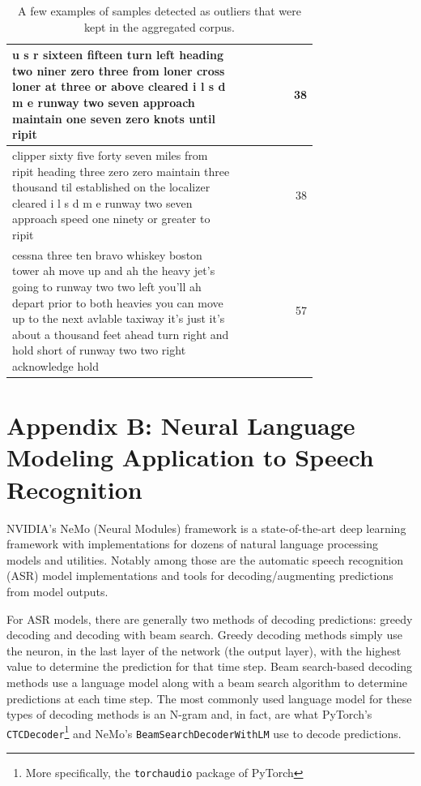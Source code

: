 \documentclass[12pt]{article}
\begin{document}
\begin{table}
\begin{tabular}{p{0.75\linewidth} r}
        \midrule
        u s r sixteen fifteen turn left heading two niner zero three from loner cross loner at three or above cleared i l s d m e runway two seven approach maintain one seven zero knots until ripit                                                                                                                               & 38              \\
        \midrule
        clipper sixty five forty seven miles from ripit heading three zero zero maintain three thousand til established on the localizer cleared i l s d m e runway two seven approach speed one ninety or greater to ripit                                                                                                         & 38              \\
        \midrule
        cessna three ten bravo whiskey boston tower ah move up and ah the heavy jet's going to runway two two left you'll ah depart prior to both heavies you can move up to the next avlable taxiway it's just it's about a thousand feet ahead turn right and hold short of runway two two right acknowledge hold                 & 57              \\
        \bottomrule
    \end{tabular}
    \caption{A few examples of samples detected as outliers that were kept in the aggregated corpus.}
    \label{tab:outlier_examples}
\end{table}

\newpage
\section{Appendix B: Neural Language Modeling Application to Speech Recognition}\label{sec:appendix_a}
NVIDIA's NeMo (Neural Modules) framework \cite{kuchaiev_nemo_2019} is a state-of-the-art deep learning framework with implementations for dozens of
natural language processing models and utilities. Notably among those are the automatic speech recognition (ASR) model implementations and tools for
decoding/augmenting predictions from model outputs.

For ASR models, there are generally two methods of decoding predictions: greedy decoding and decoding with beam search. Greedy decoding methods simply
use the neuron, in the last layer of the network (the output layer), with the highest value to determine the prediction for that time step. Beam
search-based decoding methods use a language model along with a beam search algorithm to determine predictions at each time step. The most commonly
used language model for these types of decoding methods is an N-gram and, in fact, are what PyTorch's \lstinline|CTCDecoder|\footnote{More
    specifically, the \lstinline|torchaudio| package of PyTorch} \cite{paszke_pytorch_2019} and NeMo's \lstinline|BeamSearchDecoderWithLM|
\cite{kuchaiev_nemo_2019} use to decode predictions.
\end{document}
